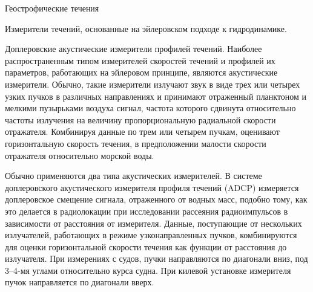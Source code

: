\begin{chapter}{Геострофические течения}
\begin{section}{Измерители течений, основанные на эйлеровском подходе 
к гидродинамике.}
\begin{paragraph}{Доплеровские акустические измерители профилей течений.}
Наиболее распространенным типом измерителей скоростей течений и
профилей их параметров, работающих на эйлеровом принципе, являются
акустические измерители. Обычно, такие измерители излучают звук в виде
трех или четырех узких пучков в различных направлениях и принимают
отраженный планктоном и мелкими пузырьками воздуха сигнал, частота
которого сдвинута относительно частоты излучения на величину
пропорциональную радиальной скорости отражателя. Комбинируя данные по
трем или четырем пучкам, оценивают горизонтальную скорость течения, в
предположении малости скорости отражателя относительно морской воды.
%

Обычно применяются два типа акустических измерителей. В системе
доплеровского акустического измерителя профиля течений (ADCP)
измеряется доплеровское смещение сигнала, отраженного от водных масс,
подобно тому, как это делается в радиолокации при исследовании
рассеяния радиоимпульсов в зависимости от расстояния от
измерителя. Данные, поступающие от нескольких излучателей, работающих
в режиме узконаправленных пучков, комбинируются для оценки
горизонтальной скорости течения как функции от расстояния до
излучателя. При измерениях с судов, пучки направляются по диагонали
вниз, под 3--4-мя углами относительно курса судна. При килевой
установке измерителя пучок направляется по диагонали вверх.
%


\end{paragraph}
\end{section}
\end{chapter}
